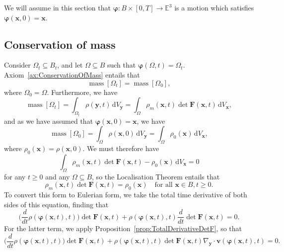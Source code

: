 \documentclass[
  letterpaper,
  DIV=11,
  numbers=noendperiod]{scrreprt}
\theoremstyle{plain}
\theoremstyle{remark}
\begin{document}
We will assume in this section that
\({\boldsymbol{\varphi}}:B\times[0,T]\to{\mathbb{E}}^3\) is a motion
which satisfies
\({\boldsymbol{\varphi}}({\boldsymbol{x}},0) = {\boldsymbol{x}}\).

\subsection{Conservation of mass}\label{sec:EulerianMass}

Consider \(\Omega_t\subseteq B_t\), and let \(\Omega\subseteq B\) such
that \({\boldsymbol{\varphi}}(\Omega,t) = \Omega_t\).
Axiom~\hyperref[ax:ConservationOfMass]{{[}ax:ConservationOfMass{]}}
entails that
\[{\operatorname{mass}}[\Omega_t] = {\operatorname{mass}}[\Omega_0],\]
where \(\Omega_0 = \Omega\). Furthermore, we have
\[{\operatorname{mass}}[\Omega_t] = \int_{\Omega_t}\rho({\boldsymbol{y}},t){\,{\mathrm{d}}V_{{\boldsymbol{y}}}}= \int_\Omega \rho_m({\boldsymbol{x}},t)\det{\boldsymbol{F}}({\boldsymbol{x}},t){\,{\mathrm{d}}V_{{\boldsymbol{x}}}},\]
and as we have assumed that
\({\boldsymbol{\varphi}}({\boldsymbol{x}},0) ={\boldsymbol{x}}\), we
have
\[{\operatorname{mass}}[\Omega_0] = \int_{\Omega}\rho({\boldsymbol{x}},0){\,{\mathrm{d}}V_{{\boldsymbol{y}}}}= \int_\Omega \rho_0({\boldsymbol{x}}){\,{\mathrm{d}}V_{{\boldsymbol{x}}}},\]
where \(\rho_0({\boldsymbol{x}}) =\rho({\boldsymbol{x}},0)\). We must
therefore have
\[\int_\Omega \rho_m({\boldsymbol{x}},t)\det{\boldsymbol{F}}({\boldsymbol{x}},t)-\rho_0({\boldsymbol{x}}){\,{\mathrm{d}}V_{{\boldsymbol{x}}}}=0\]
for any \(t\geq0\) and any \(\Omega\subseteq B\), so the Localisation
Theorem entails that \[\label{eq:ConsOfMass1}
  \rho_m({\boldsymbol{x}},t)\det{\boldsymbol{F}}({\boldsymbol{x}},t) = \rho_0({\boldsymbol{x}})\quad\text{for all }{\boldsymbol{x}}\in B, t\geq0.\]
To convert this form to Eulerian form, we take the total time derivative
of both sides of this equation, finding that
\[\bigg(\frac{d}{dt}\rho({\boldsymbol{\varphi}}({\boldsymbol{x}},t),t)\bigg)\det{\boldsymbol{F}}({\boldsymbol{x}},t)+\rho({\boldsymbol{\varphi}}({\boldsymbol{x}},t),t)\frac{d}{d t}\det{\boldsymbol{F}}({\boldsymbol{x}},t) = 0.\]
For the latter term, we apply
Proposition~\hyperref[prop:TotalDerivativeDetF]{{[}prop:TotalDerivativeDetF{]}},
so that
\[\bigg(\frac{d}{dt}\rho({\boldsymbol{\varphi}}({\boldsymbol{x}},t),t)\bigg)\det{\boldsymbol{F}}({\boldsymbol{x}},t)+\rho({\boldsymbol{\varphi}}({\boldsymbol{x}},t),t)\det{\boldsymbol{F}}({\boldsymbol{x}},t)\nabla_{\boldsymbol{y}}\cdot{\boldsymbol{v}}({\boldsymbol{\varphi}}({\boldsymbol{x}},t),t) = 0.\]
\end{document}
